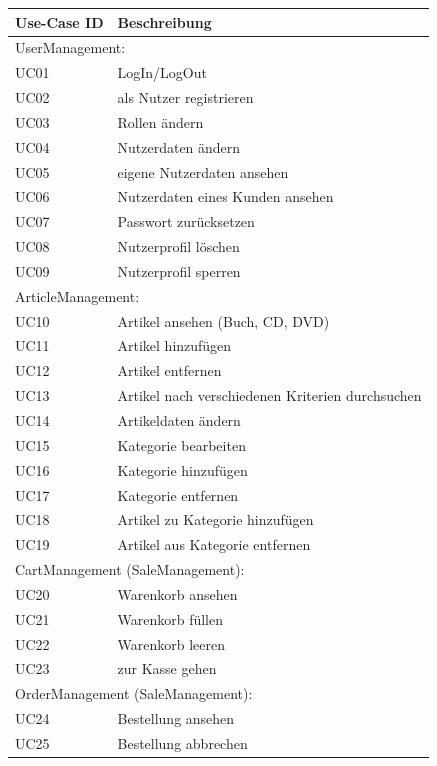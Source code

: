\documentclass[a4paper]{article}
\begin{document}
\begin{longtable}{|p{100px}|p{250px}|}
	\hline
	\rowcolor[HTML]{C0C0C0}
	Use-Case ID & Beschreibung \\ \hline
	\multicolumn{2}{|l|}{UserManagement:}  \\ \hline
	UC01 & LogIn/LogOut  \\ \hline
	UC02 & als Nutzer registrieren  \\ \hline
	UC03 & Rollen ändern \\ \hline
	UC04 & Nutzerdaten ändern  \\ \hline
	UC05 & eigene Nutzerdaten ansehen  \\ \hline
	UC06 & Nutzerdaten eines Kunden ansehen \\ \hline
	UC07 & Passwort zurücksetzen  \\ \hline
	UC08 & Nutzerprofil löschen \\ \hline
	UC09 & Nutzerprofil sperren \\ \hline
	\multicolumn{2}{|l|}{ArticleManagement:}  \\ \hline
	UC10 & Artikel ansehen (Buch, CD, DVD)  \\ \hline
	UC11 & Artikel hinzufügen  \\ \hline
	UC12 & Artikel entfernen  \\ \hline
	UC13 & Artikel nach verschiedenen Kriterien durchsuchen  \\ \hline
	UC14 & Artikeldaten ändern  \\ \hline
	UC15 & Kategorie bearbeiten  \\ \hline
	UC16 & Kategorie hinzufügen  \\ \hline
	UC17 & Kategorie entfernen  \\ \hline
	UC18 & Artikel zu Kategorie hinzufügen \\ \hline
	UC19 & Artikel aus Kategorie entfernen \\ \hline
	\multicolumn{2}{|l|}{CartManagement (SaleManagement):}  \\ \hline
	UC20 & Warenkorb ansehen  \\ \hline
	UC21 & Warenkorb füllen \\ \hline
	UC22 & Warenkorb leeren \\ \hline
	UC23 & zur Kasse gehen  \\ \hline
	\multicolumn{2}{|l|}{OrderManagement (SaleManagement):}  \\ \hline
	UC24 & Bestellung ansehen  \\ \hline
	UC25 & Bestellung abbrechen  \\ \hline

\end{longtable}
\end{document}
